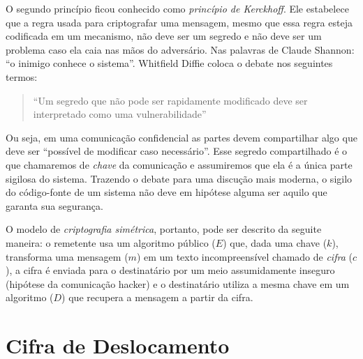 O segundo princípio ficou conhecido como {\em princípio de Kerckhoff}.
Ele estabelece que a regra usada para criptografar uma mensagem, mesmo que essa regra esteja codificada em um mecanismo, não deve ser um segredo e não deve ser um problema caso ela caia nas mãos do adversário.
Nas palavras de Claude Shannon: ``o inimigo conhece o sistema''.
Whitfield Diffie coloca o debate nos seguintes termos:

\begin{quote}
``Um segredo que não pode ser rapidamente modificado deve ser interpretado como uma vulnerabilidade''
\end{quote}

Ou seja, em uma comunicação confidencial as partes devem compartilhar algo que deve ser ``possível de modificar caso necessário''.
Esse segredo compartilhado é o que chamaremos de {\em chave} da comunicação e assumiremos que ela é a única parte sigilosa do sistema.
Trazendo o debate para uma discução mais moderna, o sigilo do código-fonte de um sistema não deve em hipótese alguma ser aquilo que garanta sua segurança.

O modelo de {\em criptografia simétrica}, portanto, pode ser descrito da seguite maneira:
o remetente usa um algoritmo público ($E$) que, dada uma chave ($k$), transforma uma mensagem ($m$) em um texto incompreensível chamado de {\em cifra} ($c$), a cifra é enviada para o destinatário por um meio assumidamente inseguro (hipótese da comunicação hacker) e o destinatário utiliza a mesma chave em um algoritmo ($D$) que recupera a mensagem a partir da cifra.

\begin{center}
\end{center}

\section{Cifra de Deslocamento}
\label{sec:cifra-deslocamento}

